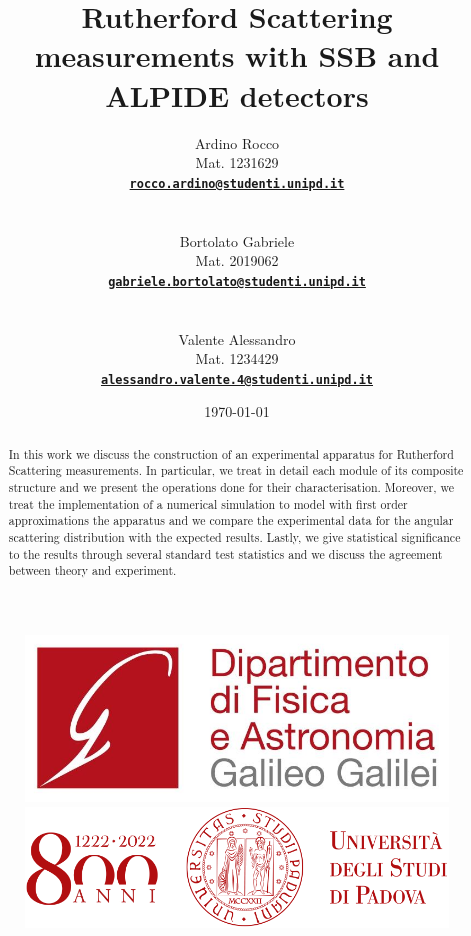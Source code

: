 \begin{figure}[H]
    \begin{minipage}{0.25\linewidth}
        \includegraphics[width=\linewidth]{../titlepage/images/logo_DFA.jpg}
    \end{minipage}
    \hfill
    \begin{minipage}{0.35\linewidth}
        \includegraphics[width=\textwidth]{../titlepage/images/logo_800anni.png}
    \end{minipage}
\end{figure}

\noindent\makebox[\linewidth]{\color{linescolor} \rule{0.85\paperwidth}{1.2 pt}}
\noindent\makebox[\linewidth]{\color{linescolor} \rule[0.3cm]{0.85\paperwidth}{1pt}}

\title{Rutherford Scattering measurements with SSB and ALPIDE detectors}
\author{
    \parbox{3.25cm}{Ardino Rocco}       \parbox{2.5cm}{Mat. 1231629} \parbox{6.0cm}{\bf\href{mailto:rocco.ardino@studenti.unipd.it}{\texttt{rocco.ardino@studenti.unipd.it}}}          \\
    \parbox{3.25cm}{Bortolato Gabriele} \parbox{2.5cm}{Mat. 2019062} \parbox{6.0cm}{\bf\href{mailto:gabriele.bortolato@studenti.unipd.it}{\texttt{gabriele.bortolato@studenti.unipd.it}}}    \\
    \parbox{3.25cm}{Valente Alessandro} \parbox{2.5cm}{Mat. 1234429} \parbox{6.0cm}{\bf\href{mailto:alessandro.valente.4@studenti.unipd.it}{\texttt{alessandro.valente.4@studenti.unipd.it}}}
}
\date{\today}

\begin{abstract}
    In this work we discuss the construction of an experimental apparatus for Rutherford Scattering measurements. In particular, we treat in detail each module of its composite structure and we present the operations done for their characterisation. Moreover, we treat the implementation of a numerical simulation to model with first order approximations the apparatus and we compare the experimental data for the angular scattering distribution with the expected results. Lastly, we give statistical significance to the results through several standard test statistics and we discuss the agreement between theory and experiment.
\end{abstract}

